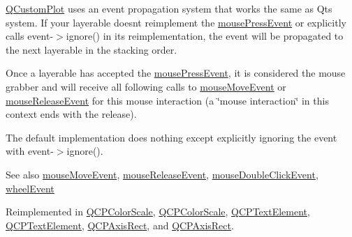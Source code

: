 \hyperlink{class_q_custom_plot}{Q\+Custom\+Plot} uses an event propagation system that works the same as Qt\textquotesingle{}s system. If your layerable doesn\textquotesingle{}t reimplement the \hyperlink{class_q_c_p_layerable_af6567604818db90f4fd52822f8bc8376}{mouse\+Press\+Event} or explicitly calls {\ttfamily event-\/$>$ignore()} in its reimplementation, the event will be propagated to the next layerable in the stacking order.

Once a layerable has accepted the \hyperlink{class_q_c_p_layerable_af6567604818db90f4fd52822f8bc8376}{mouse\+Press\+Event}, it is considered the mouse grabber and will receive all following calls to \hyperlink{class_q_c_p_layerable_a9eee1ba47fd69be111059ca3881933e4}{mouse\+Move\+Event} or \hyperlink{class_q_c_p_layerable_aa0d79b005686f668622bbe66ac03ba2c}{mouse\+Release\+Event} for this mouse interaction (a \char`\"{}mouse interaction\char`\"{} in this context ends with the release).

The default implementation does nothing except explicitly ignoring the event with {\ttfamily event-\/$>$ignore()}.

\begin{DoxySeeAlso}{See also}
\hyperlink{class_q_c_p_layerable_a9eee1ba47fd69be111059ca3881933e4}{mouse\+Move\+Event}, \hyperlink{class_q_c_p_layerable_aa0d79b005686f668622bbe66ac03ba2c}{mouse\+Release\+Event}, \hyperlink{class_q_c_p_layerable_a4171e2e823aca242dd0279f00ed2de81}{mouse\+Double\+Click\+Event}, \hyperlink{class_q_c_p_layerable_a47dfd7b8fd99c08ca54e09c362b6f022}{wheel\+Event} 
\end{DoxySeeAlso}


Reimplemented in \hyperlink{class_q_c_p_color_scale_a91f633b97ffcd57fdf8cd814974c20e6}{Q\+C\+P\+Color\+Scale}, \hyperlink{class_q_c_p_color_scale_ab73a9f3a28aec68494e26bbdd1bb987a}{Q\+C\+P\+Color\+Scale}, \hyperlink{class_q_c_p_text_element_ad7b2c98355e3d2f912574b74fcee0574}{Q\+C\+P\+Text\+Element}, \hyperlink{class_q_c_p_text_element_aa52d0292e7444526cccd453945238f4b}{Q\+C\+P\+Text\+Element}, \hyperlink{class_q_c_p_axis_rect_aa9a7c807eaa4666870ac94aa6abc4dde}{Q\+C\+P\+Axis\+Rect}, and \hyperlink{class_q_c_p_axis_rect_a8f514245839c0bfd9472e945899064e7}{Q\+C\+P\+Axis\+Rect}.

\mbox{\label{class_q_c_p_layerable_aa0d79b005686f668622bbe66ac03ba2c}} 

